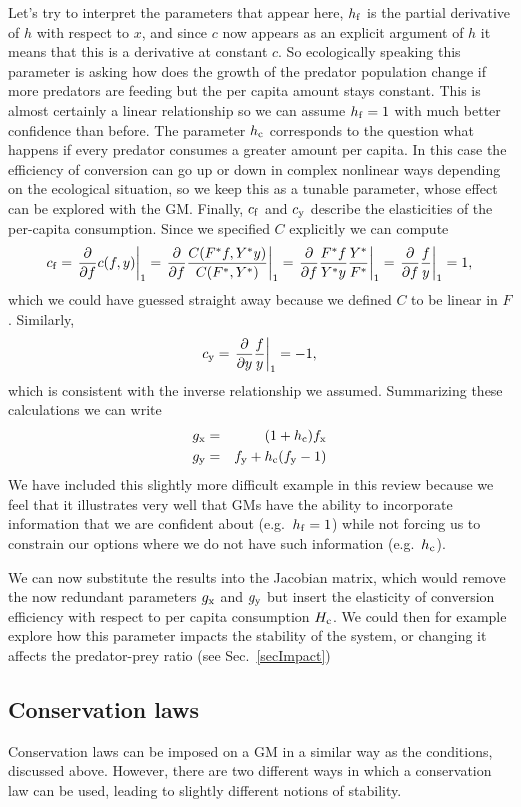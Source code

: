 \documentclass{article}
\newcommand{\eq}[1]{\begin{equation}#1\end{equation}}
\newcommand{\eqa}[1]{\begin{eqnarray}#1\end{eqnarray}}
\begin{document}
Let's try to interpret the parameters that appear here, $h_{\rm f}$ is the partial derivative of $h$ with respect to $x$, and since $c$ now appears as an explicit argument of $h$ it means that this is a derivative at constant $c$. So ecologically speaking this parameter is asking how does the growth of the predator population change if more predators are feeding but the per capita amount stays constant. This is almost certainly a linear relationship so we can assume $h_{\rm f}=1$ with much better confidence than before. The parameter $h_{\rm c}$ corresponds to the question what happens if every predator consumes a greater amount per capita. In this case the efficiency of conversion can go up or down in complex nonlinear ways depending on the ecological situation, so we keep this as a tunable parameter, whose effect can be explored with the GM. Finally, $c_{\rm f}$ and $c_{\rm y}$ describe the elasticities of the per-capita consumption. Since we specified $C$ explicitly we can compute 
\eq{
c_{\rm f} = \left. \frac{\partial}{\partial f} c(f,y) \right|_1  
         = \left. \frac{\partial}{\partial f} \frac{C(F^*f,Y^*y)}{C(F^*,Y^*)} \right|_1
         = \left. \frac{\partial}{\partial f} \frac{F^*f}{Y^*y}\frac{Y^*}{F^*} \right|_1
         =  \left. \frac{\partial}{\partial f} \frac{f}{y} \right|_1
         =  1,  
} 
which we could have guessed straight away because we defined $C$ to be linear in $F$. Similarly,
\eq{
c_{\rm y}=  \left. \frac{\partial}{\partial y} \frac{f}{y} \right|_1
         =  -1,  
}
which is consistent with the inverse relationship we assumed. Summarizing these calculations we can write 
\eqa{
g_{\rm x} &=& (1 + h_{\rm c})f_{\rm x} \\
g_{\rm y} &=& f_{\rm y} + h_{\rm c}(f_{\rm y}-1) 
}
We have included this slightly more difficult example in this review because we feel that it illustrates very well that GMs have the ability to incorporate information that we are confident about (e.g.~$h_{\rm f}=1$) while not forcing us to constrain our options where we do not have such information (e.g.~$h_{\rm c}$). 

We can now substitute the results into the Jacobian matrix, which would remove the now redundant parameters $g_{\rm x}$ and $g_{\rm y}$ but insert the elasticity of conversion efficiency with respect to per capita consumption $H_{\rm c}$. We could then for example explore how this parameter impacts the stability of the system, or changing it affects the predator-prey ratio (see Sec.~\ref{secImpact})
 
\subsection{Conservation laws}
Conservation laws can be imposed on a GM in a similar way as the conditions, discussed above. However, there are two different ways in which a conservation law can be used, leading to slightly different notions of stability. 
\end{document}
